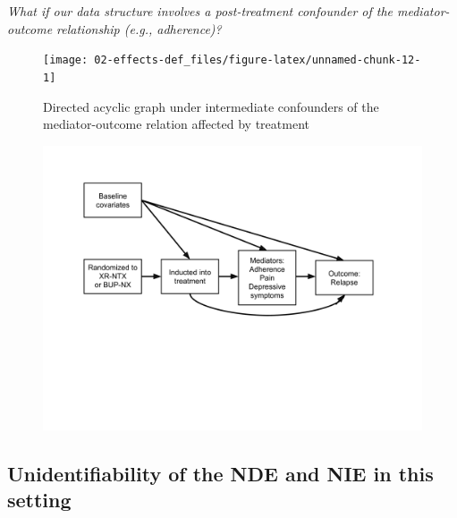 \documentclass[
  12pt,
]{book}
\theoremstyle{definition}
\theoremstyle{definition}
\theoremstyle{definition}
\newcommand{\1}{\mathbbm{1}}
\begin{document}
\emph{What if our data structure involves a post-treatment confounder of the
mediator-outcome relationship (e.g., adherence)?}

\begin{figure}

{\centering \texttt{[image: 02-effects-def\_files/figure-latex/unnamed-chunk-12-1]} 

}

\caption{Directed acyclic graph under intermediate confounders of the mediator-outcome relation affected by treatment}\label{fig:unnamed-chunk-12}
\end{figure}

\begin{figure}

{\centering \includegraphics[width=1\linewidth]{img/ctndag} 

}

\end{figure}

\hypertarget{unidentifiability-of-the-nde-and-nie-in-this-setting}{%
\subsection{Unidentifiability of the NDE and NIE in this setting}\label{unidentifiability-of-the-nde-and-nie-in-this-setting}}
\end{document}
